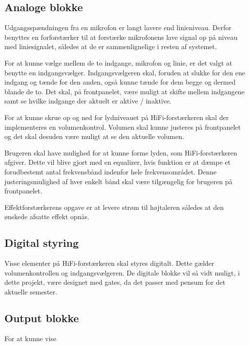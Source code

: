 \subsection*{Analoge blokke}

Udgangsspændningen fra en mikrofon er langt lavere end linieniveau. Derfor benyttes en forforstærker til at forstærke mikrofonens lave signal op på niveau med liniesignalet, således at de er sammenlignelige i resten af systemet.

For at kunne vælge mellem de to indgange, mikrofon og linie, er det valgt at benytte en indgangsvælger. Indgangsvælgeren skal, foruden at slukke for den ene indgang og tænde for den anden, også kunne tænde for dem begge og dermed blande de to. Det skal, på frontpanelet, være muligt at skifte mellem indgangene samt se hvilke indgange der aktuelt er aktive / inaktive. 

For at kunne skrue op og ned for lydniveauet på HiFi-forstærkeren skal der implementeres en volumenkontrol. Volumen skal kunne justeres på frontpanelet og det skal desuden være muligt at se den aktuelle volumen. 

Brugeren skal have mulighed for at kunne forme lyden, som HiFi-forstærkeren afgiver. Dette vil blive gjort med en equalizer, hvis funktion er at dæmpe et forudbestemt antal frekvensbånd indenfor hele frekvensområdet. Denne justeringsmulighed af hver enkelt bånd skal være tilgængelig for brugeren på frontpanelet. 

Effektforstærkerens opgave er at levere strøm til højtaleren således at den ønskede afsatte effekt opnås.

\subsection*{Digital styring}
Visse elementer på HiFi-forstærkeren skal styres digitalt. Dette gælder volumenkontrollen og indgangsvælgeren. De digitale blokke vil så vidt muligt, i dette projekt, være designet med gates, da det passer med pensum for det aktuelle semester. 


\subsection*{Output blokke}

For at kunne vise 